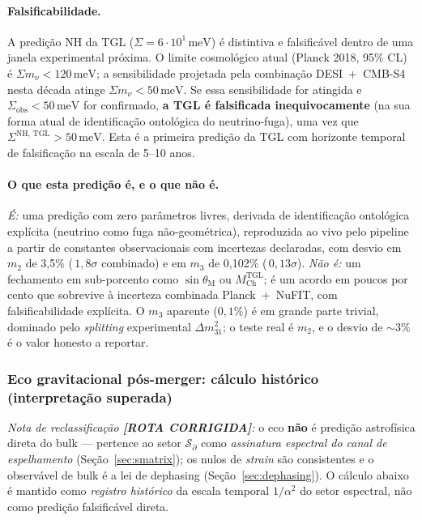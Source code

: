 \documentclass[12pt,a4paper]{article}
\newcommand{\thetaM}{\theta_{\text{M}}}
\newcommand{\TGL}{\textsc{TGL}}
\begin{document}
\paragraph{Falsificabilidade.}
A predição NH da \TGL{} ($\Sigma = 6 \cdot 10^{1}\,\mathrm{meV}$) é
distintiva e falsificável dentro de uma janela experimental próxima.  O
limite cosmológico atual (Planck 2018, 95\% CL) é
$\Sigma m_\nu < 120\,\mathrm{meV}$; a sensibilidade projetada pela
combinação DESI~+~CMB-S4 nesta década atinge $\Sigma m_\nu < 50\,\mathrm{meV}$.
Se essa sensibilidade for atingida e $\Sigma_{\text{obs}} < 50\,\mathrm{meV}$
for confirmado, \textbf{a \TGL{} é falsificada inequivocamente} (na sua
forma atual de identificação ontológica do neutrino-fuga), uma vez que
$\Sigma^{\text{NH, TGL}} > 50\,\mathrm{meV}$.  Esta é a primeira predição
da \TGL{} com horizonte temporal de falsificação na escala de 5--10 anos.

\paragraph{O que esta predição é, e o que não é.}
\emph{É:} uma predição com zero parâmetros livres, derivada de identificação
ontológica explícita (neutrino como fuga não-geométrica), reproduzida
ao vivo pelo pipeline a partir de constantes observacionais com incertezas
declaradas, com desvio em $m_2$ de 3{,}5\% (\,$1{,}8\sigma$ combinado) e em $m_3$ de 0{,}102\% (\,$0{,}13\sigma$).  \emph{Não é:} um
fechamento em sub-porcento como $\sin\thetaM$ ou $M_{\text{Ch}}^{\text{TGL}}$; é
um acordo em poucos por cento que sobrevive à incerteza combinada
Planck~+~NuFIT, com falsificabilidade explícita.  O $m_3$ aparente
($0{,}1\%$) é em grande parte trivial, dominado pelo \emph{splitting}
experimental $\Delta m^2_{31}$; o teste real é $m_2$, e o desvio de
$\sim 3\%$ é o valor honesto a reportar.


\subsubsection{Eco gravitacional pós-merger: cálculo histórico (interpretação superada)}
\label{sec:gw-echo}

\emph{Nota de reclassificação \textbf{[ROTA CORRIGIDA]}:} o eco \textbf{não} é predição
astrofísica direta do bulk --- pertence ao setor $\mathcal S_\partial$ como
\emph{assinatura espectral do canal de espelhamento} (Seção~\ref{sec:smatrix}); os nulos
de \emph{strain} são consistentes e o observável de bulk é a lei de dephasing
(Seção~\ref{sec:dephasing}).  O cálculo abaixo é mantido como \emph{registro histórico}
da escala temporal $1/\alpha^{2}$ do setor espectral, não como predição falsificável
direta.
\end{document}
